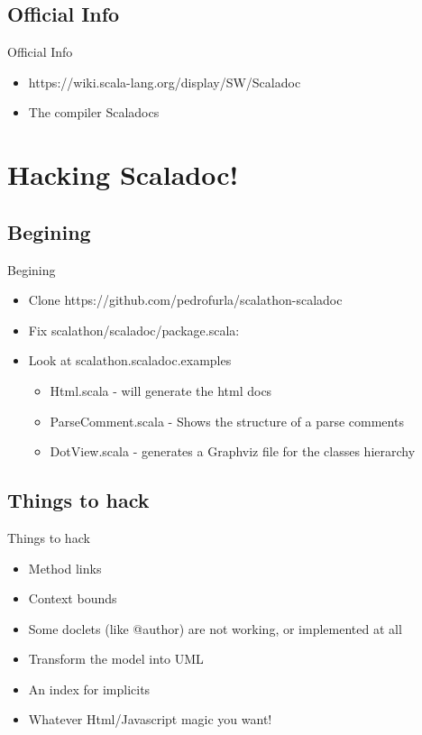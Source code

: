 \documentclass{beamer}
\begin{document}
\subsection{Official Info}
\begin{frame}{Official Info} 
	\begin{itemize}  
		\item https://wiki.scala-lang.org/display/SW/Scaladoc
		\item The compiler Scaladocs
	\end{itemize}
\end{frame}

\section{Hacking Scaladoc!}

\subsection{Begining}
\begin{frame}{Begining} 
	\begin{itemize}  
	\item Clone https://github.com/pedrofurla/scalathon-scaladoc
	\item Fix scalathon/scaladoc/package.scala: 
	\item Look at scalathon.scaladoc.examples
		\begin{itemize}  
			\item Html.scala - will generate the html docs 
			\item ParseComment.scala - Shows the structure of a parse comments
			\item DotView.scala - generates a Graphviz file for the classes hierarchy
		\end{itemize}
	\end{itemize}
\end{frame}

\subsection{Things to hack}
\begin{frame}{Things to hack} 
	\begin{itemize}  
	\item Method links
	\item Context bounds
	\item Some doclets (like @author) are not working, or implemented at all
	\item Transform the model into UML
	\item An index for implicits
	\item Whatever Html/Javascript magic you want!
	\end{itemize}
\end{frame}
\end{document}
